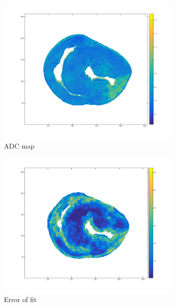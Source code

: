 \begin{figure}[h!]
    \begin{subfigure}{.31\textwidth}
        \includegraphics[width=\textwidth]{figures/pig5_adc_22}
        \caption{ADC map}
        \label{fig:pig5_adc}
    \end{subfigure}
    \begin{subfigure}{.31\textwidth}
        \includegraphics[width=\textwidth]{figures/pig5_err_22}
        \caption{Error of fit}
        \label{fig:pig5_err}
    \end{subfigure}
    \begin{subfigure}{.31\textwidth}

\end{subfigure}
\end{figure}
